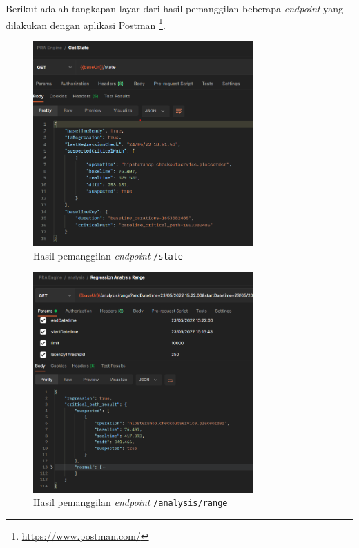 Berikut adalah tangkapan layar dari hasil pemanggilan beberapa \textit{endpoint} yang dilakukan dengan aplikasi Postman \footnote{\url{https://www.postman.com/}}.
\begin{figure}[h!]
	\centering
	\includegraphics[width=0.75\textwidth]{resources/ch4/result_state.png}
	\caption{Hasil pemanggilan \textit{endpoint} \texttt{/state}}
	\label{api_state}
\end{figure} 
\begin{figure}[h!]
	\centering
	\includegraphics[width=0.75\textwidth]{resources/ch4/result_analysis_range.png}
	\caption{Hasil pemanggilan \textit{endpoint} \texttt{/analysis/range}}
	\label{api_analysis_range}
\end{figure} 
